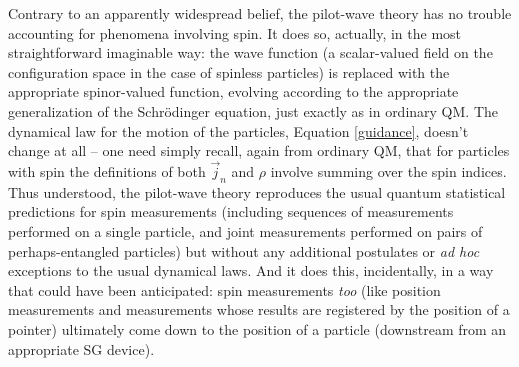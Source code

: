 \documentclass[aps,prc,onecolumn,letterpaper,floatfix,12pt]{revtex4}
\begin{document}


Contrary to an apparently widespread belief, the pilot-wave theory has
no trouble accounting for phenomena involving spin.  It does so,
actually, in the most straightforward imaginable way:  the wave
function (a scalar-valued field on the configuration space in the case
of spinless particles) is replaced with the appropriate spinor-valued
function, evolving according to the appropriate generalization of the
Schr\"odinger equation, just exactly as in ordinary QM.  The dynamical law for the
motion of the particles, Equation \eqref{guidance}, doesn't change at
all -- one need simply recall, again from ordinary QM, that for
particles with spin the definitions of both $\vec{j}_n$ and $\rho$
involve summing over the spin indices.  Thus understood, the
pilot-wave theory reproduces the usual quantum statistical predictions for
spin measurements (including sequences of measurements performed on a
single particle, and joint measurements performed on pairs of
perhaps-entangled particles) but without any additional postulates or
\emph{ad hoc} exceptions to the usual dynamical laws.  And it does
this, incidentally, in a way that could have been anticipated:  spin
measurements \emph{too} (like position measurements and measurements
whose results are registered by the position of a pointer) ultimately
come down to the position of a particle (downstream from an
appropriate SG device).  
\end{document}
